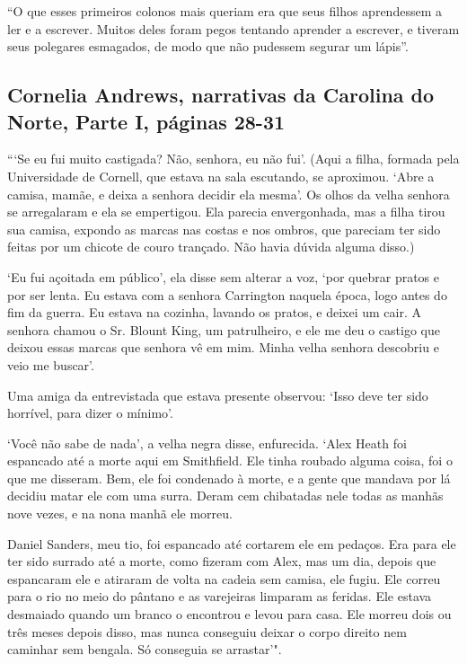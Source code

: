 ``O que esses primeiros colonos mais queriam era que seus filhos
aprendessem a ler e a escrever. Muitos deles foram pegos tentando
aprender a escrever, e tiveram seus polegares esmagados, de modo que não
pudessem segurar um lápis''.

\subsection{Cornelia Andrews, narrativas da Carolina do Norte, Parte I, páginas 28-31} \label{ref07}

```Se eu fui muito castigada? Não, senhora, eu não fui'. (Aqui a
filha, formada pela Universidade de Cornell, que estava na sala
escutando, se aproximou. `Abre a camisa, mamãe, e deixa a senhora
decidir ela mesma'. Os olhos da velha senhora se arregalaram e ela se
empertigou. Ela parecia envergonhada, mas a filha tirou sua camisa,
expondo as marcas nas costas e nos ombros, que pareciam ter sido feitas
por um chicote de couro trançado. Não havia dúvida alguma disso.)

`Eu fui açoitada em público', ela disse sem alterar a voz, `por quebrar
pratos e por ser lenta. Eu estava com a senhora Carrington naquela
época, logo antes do fim da guerra. Eu estava na cozinha, lavando os
pratos, e deixei um cair. A senhora chamou o Sr. Blount King, um
patrulheiro, e ele me deu o castigo que deixou essas marcas que senhora
vê em mim. Minha velha senhora descobriu e veio me buscar'.

Uma amiga da entrevistada que estava presente observou: `Isso deve ter
sido horrível, para dizer o mínimo'.

`Você não sabe de nada', a velha negra disse, enfurecida. `Alex Heath
foi espancado até a morte aqui em Smithfield. Ele tinha roubado alguma
coisa, foi o que me disseram. Bem, ele foi condenado à morte, e a gente
que mandava por lá decidiu matar ele com uma surra. Deram cem chibatadas
nele todas as manhãs nove vezes, e na nona manhã ele morreu.

Daniel Sanders, meu tio, foi espancado até cortarem ele em pedaços. Era
para ele ter sido surrado até a morte, como fizeram com Alex, mas um
dia, depois que espancaram ele e atiraram de volta na cadeia sem camisa,
ele fugiu. Ele correu para o rio no meio do pântano e as varejeiras
limparam as feridas. Ele estava desmaiado quando um branco o encontrou e
levou para casa. Ele morreu dois ou três meses depois disso, mas nunca
conseguiu deixar o corpo direito nem caminhar sem bengala. Só conseguia
se arrastar'".

